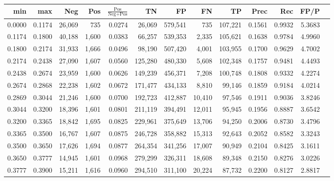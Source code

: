 \begin{tabular}{rrrrrrrrrrrrr}
\toprule
   min &    max &    Neg &   Pos & $\frac{\text{Pos}}{\text{Neg}+\text{Pos}}$ &      TN &      FP &      FN &      TP &   Prec &    Rec &   FP/P \\
\midrule
0.0000 & 0.1174 & 26,069 &   735 &                                     0.0274 &  26,069 & 579,541 &     735 & 107,221 & 0.1561 & 0.9932 & 5.3683 \\
0.1174 & 0.1800 & 40,188 & 1,600 &                                     0.0383 &  66,257 & 539,353 &   2,335 & 105,621 & 0.1638 & 0.9784 & 4.9960 \\
0.1800 & 0.2174 & 31,933 & 1,666 &                                     0.0496 &  98,190 & 507,420 &   4,001 & 103,955 & 0.1700 & 0.9629 & 4.7002 \\
0.2174 & 0.2438 & 27,090 & 1,607 &                                     0.0560 & 125,280 & 480,330 &   5,608 & 102,348 & 0.1757 & 0.9481 & 4.4493 \\
0.2438 & 0.2674 & 23,959 & 1,600 &                                     0.0626 & 149,239 & 456,371 &   7,208 & 100,748 & 0.1808 & 0.9332 & 4.2274 \\
0.2674 & 0.2868 & 22,238 & 1,602 &                                     0.0672 & 171,477 & 434,133 &   8,810 &  99,146 & 0.1859 & 0.9184 & 4.0214 \\
0.2869 & 0.3044 & 21,246 & 1,600 &                                     0.0700 & 192,723 & 412,887 &  10,410 &  97,546 & 0.1911 & 0.9036 & 3.8246 \\
0.3044 & 0.3200 & 18,396 & 1,601 &                                     0.0801 & 211,119 & 394,491 &  12,011 &  95,945 & 0.1956 & 0.8887 & 3.6542 \\
0.3200 & 0.3365 & 18,842 & 1,695 &                                     0.0825 & 229,961 & 375,649 &  13,706 &  94,250 & 0.2006 & 0.8730 & 3.4796 \\
0.3365 & 0.3500 & 16,767 & 1,607 &                                     0.0875 & 246,728 & 358,882 &  15,313 &  92,643 & 0.2052 & 0.8582 & 3.3243 \\
0.3500 & 0.3650 & 17,626 & 1,694 &                                     0.0877 & 264,354 & 341,256 &  17,007 &  90,949 & 0.2104 & 0.8425 & 3.1611 \\
0.3650 & 0.3777 & 14,945 & 1,601 &                                     0.0968 & 279,299 & 326,311 &  18,608 &  89,348 & 0.2150 & 0.8276 & 3.0226 \\
0.3777 & 0.3900 & 15,211 & 1,616 &                                     0.0960 & 294,510 & 311,100 &  20,224 &  87,732 & 0.2200 & 0.8127 & 2.8817 \\

\end{tabular}
